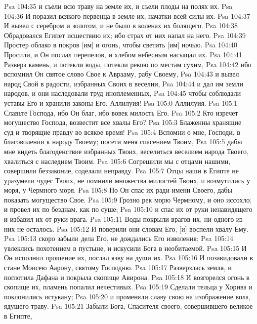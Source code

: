 \vs Psa 104:35 и съели всю траву на земле их, и съели плоды на полях их.
\vs Psa 104:36 И поразил всякого первенца в земле их, начатки всей силы их.
\vs Psa 104:37 И вывел  с серебром и золотом, и не было в коленах их болящего.
\vs Psa 104:38 Обрадовался Египет исшествию их; ибо страх от них напал на него.
\vs Psa 104:39 Простер облако в покров [им] и огонь, чтобы светить [им] ночью.
\vs Psa 104:40 Просили, и Он послал перепелов, и хлебом небесным насыщал их.
\vs Psa 104:41 Разверз камень, и потекли воды, потекли рекою по местам сухим,
\vs Psa 104:42 ибо вспомнил Он святое слово Свое к Аврааму, рабу Своему,
\vs Psa 104:43 и вывел народ Свой в радости, избранных Своих в веселии,
\vs Psa 104:44 и дал им земли народов, и они наследовали труд иноплеменных,
\vs Psa 104:45 чтобы соблюдали уставы Его и хранили законы Его. Аллилуия!
\vs Psa 105:0 Аллилуия.
\rsbpar\vs Psa 105:1 Славьте Господа, ибо Он благ, ибо вовек милость Его.
\vs Psa 105:2 Кто изречет могущество Господа, возвестит все хвалы Его?
\vs Psa 105:3 Блаженны хранящие суд и творящие правду во всякое время!
\vs Psa 105:4 Вспомни о мне, Господи, в благоволении к народу Твоему; посети меня спасением Твоим,
\vs Psa 105:5 дабы мне видеть благоденствие избранных Твоих, веселиться веселием народа Твоего, хвалиться с наследием Твоим.
\vs Psa 105:6 Согрешили мы с отцами нашими, совершили беззаконие, соделали неправду.
\vs Psa 105:7 Отцы наши в Египте не уразумели чудес Твоих, не помнили множества милостей Твоих, и возмутились у моря, у Чермного моря.
\vs Psa 105:8 Но Он спас их ради имени Своего, дабы показать могущество Свое.
\vs Psa 105:9 Грозно рек морю Чермному, и оно иссохло; и провел их по безднам, как по суше;
\vs Psa 105:10 и спас их от руки ненавидящего и избавил их от руки врага.
\vs Psa 105:11 Воды покрыли врагов их, ни одного из них не осталось.
\vs Psa 105:12 И поверили они словам Его, [и] воспели хвалу Ему.
\vs Psa 105:13  скоро забыли дела Его, не дождались Его изволения;
\vs Psa 105:14 увлеклись похотением в пустыне, и искусили Бога в необитаемой.
\vs Psa 105:15 И Он исполнил прошение их,  послал язву на души их.
\vs Psa 105:16 И позавидовали в стане Моисею  Аарону, святому Господню.
\vs Psa 105:17 Разверзлась земля, и поглотила Дафана и покрыла скопище Авирона.
\vs Psa 105:18 И возгорелся огонь в скопище их, пламень попалил нечестивых.
\vs Psa 105:19 Сделали тельца у Хорива и поклонились истукану;
\vs Psa 105:20 и променяли славу свою на изображение вола, ядущего траву.
\vs Psa 105:21 Забыли Бога, Спасителя своего, совершившего великое в Египте,
